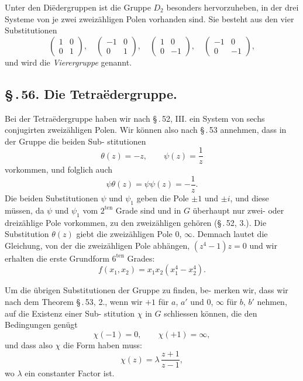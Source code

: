 \documentclass[12pt,a4paper]{article}
\theoremstyle{plain}
\theoremstyle{definition}
\theoremstyle{remark}
\newcommand{\sect}[1]{\S\,.\,#1.}
\begin{document}
Unter den Di\"edergruppen ist die Gruppe $D_2$ besonders
hervorzuheben, in der drei Systeme von je zwei zweiz\"ahligen
Polen vorhanden sind. Sie besteht aus den vier Substitutionen
\begin{equation}\label{eq:55_9}
\begin{pmatrix}1 & 0\\ 0 & 1\end{pmatrix},\quad
\begin{pmatrix}-1 & 0\\ 0 & 1\end{pmatrix},\quad
\begin{pmatrix}1 & 0\\ 0 & -1\end{pmatrix},\quad
\begin{pmatrix}-1 & 0\\ 0 & -1\end{pmatrix},\tag{$2^\circ$}
\end{equation}
und wird die \emph{Vierergruppe} genannt.


\subsection*{\sect{56} Die Tetra\"edergruppe.}

Bei der Tetra\"edergruppe haben wir nach \S\,.\,52, III. ein
System von sechs conjugirten zweiz\"ahligen Polen. Wir k\"onnen
also nach \S\,.\,53 annehmen, dass in der Gruppe die beiden Sub-
stitutionen
\[
\theta(z) = -z,\qquad \psi(z) = \frac{1}{z}
\]
vorkommen, und folglich auch
\[
\psi\theta(z) = \psi\psi(z) = -\frac{1}{z}.
\]
Die beiden Substitutionen $\psi$ und $\psi_1$ geben die Pole $\pm 1$
und $\pm i$, und diese m\"ussen, da $\psi$ und $\psi_1$ vom $2^{\text{ten}}$ Grade sind
und in $G$ \"uberhaupt nur zwei- oder dreiz\"ahlige Pole vorkommen,
zu den zweiz\"ahligen geh\"oren (\S\,.\,52, 3.). Die Substitution $\theta(z)$
giebt die zweiz\"ahligen Pole $0$, $\infty$. Demnach lautet die Gleichung,
von der die zweiz\"ahligen Pole abh\"angen, $(z^4 - 1)z = 0$ und wir
erhalten die erste Grundform $6^{\text{ten}}$ Grades:
\begin{equation}\label{eq:56_1}
f(x_1, x_2) = x_1 x_2 (x_1^4 - x_2^4).\tag{1}
\end{equation}

Um die \"ubrigen Substitutionen der Gruppe zu finden, be-
merken wir, dass wir nach dem Theorem \S\,.\,53, 2., wenn wir $+1$
f\"ur $a$, $a'$ und $0$, $\infty$ f\"ur $b$, $b'$ nehmen, auf die Existenz einer Sub-
stitution $\chi$ in $G$ schliessen k\"onnen, die den Bedingungen gen\"ugt
\[
\chi(-1) = 0,\qquad \chi(+1) = \infty,
\]
und dass also $\chi$ die Form haben muss:
\begin{equation}\label{eq:56_2}
\chi(z) = \lambda\,\frac{z+1}{z-1},\tag{2}
\end{equation}
wo $\lambda$ ein constanter Factor ist.
\end{document}
